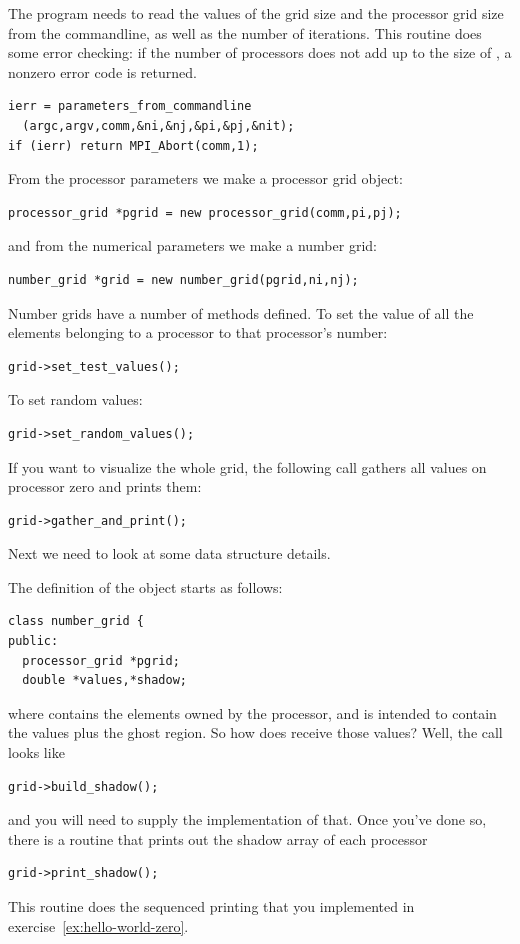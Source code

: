 The program needs to read the values of the grid size and the
processor grid size from the commandline, as well as the number of
iterations. This routine does some error checking: if the number of
processors does not add up to the size of , a
nonzero error code is returned.
\begin{verbatim}
ierr = parameters_from_commandline
  (argc,argv,comm,&ni,&nj,&pi,&pj,&nit);
if (ierr) return MPI_Abort(comm,1);
\end{verbatim}
From the processor parameters we make a processor grid object:
\begin{verbatim}
processor_grid *pgrid = new processor_grid(comm,pi,pj);
\end{verbatim}
and from the numerical parameters we make a number grid:
\begin{verbatim}
number_grid *grid = new number_grid(pgrid,ni,nj);
\end{verbatim}
Number grids have a number of methods defined. To set the value of all
the elements belonging to a processor to that processor's number:
\begin{verbatim}
grid->set_test_values();
\end{verbatim}
To set random values:
\begin{verbatim}
grid->set_random_values();
\end{verbatim}
If you want to visualize the whole grid, the following call gathers
all values on processor zero and prints them:
\begin{verbatim}
grid->gather_and_print();
\end{verbatim}

Next we need to look at some data structure details.

The definition of the  object starts as follows:
\begin{verbatim}
class number_grid {
public:
  processor_grid *pgrid;
  double *values,*shadow;
\end{verbatim}
where  contains the elements owned by the processor,
and  is intended to contain the values plus the ghost
region. So how does  receive those values? Well, the call looks 
like
\begin{verbatim}
grid->build_shadow();
\end{verbatim}
and you will need to supply the implementation of that.
Once you've done so, there is a routine that prints out the shadow array 
of each processor
\begin{verbatim}
grid->print_shadow();
\end{verbatim}
This routine does the sequenced printing that you implemented in
exercise~\ref{ex:hello-world-zero}.

